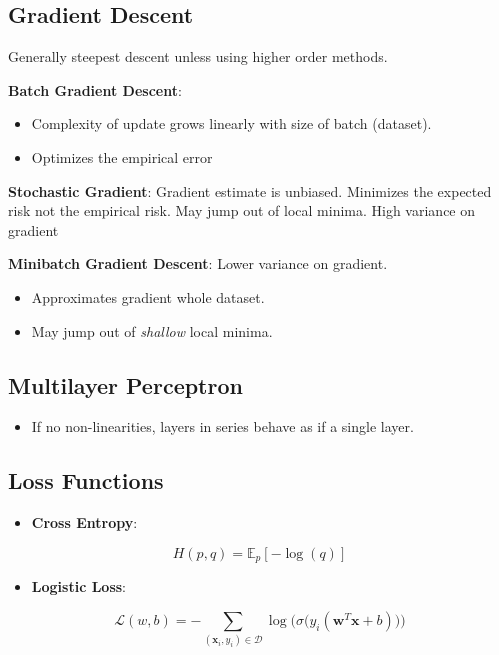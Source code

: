 \documentclass[10pt]{article}
\newcommand{\colortext}[2]{{\color{#1} #2}}
\newcommand{\red}[1]{\colortext{red}{#1}}
\newcommand{\blue}[1]{\colortext{blue}{#1}}
\begin{document}
\begin{multicols}{3}
  \subsection*{Gradient Descent}

  Generally \red{steepest descent} unless using higher order methods.

  \textbf{Batch Gradient Descent}:
  \begin{itemize}
    \item Complexity of update grows linearly with size of batch (dataset).
    \item Optimizes the \blue{empirical error}
  \end{itemize}

  \textbf{Stochastic Gradient}: Gradient estimate is unbiased. Minimizes the \red{expected risk} not the empirical risk.  May jump out of local minima. High variance on gradient

  \textbf{Minibatch Gradient Descent}: Lower variance on gradient.
  \begin{itemize}
    \item Approximates gradient whole dataset.
    \item May jump out of \textit{shallow} local minima.
  \end{itemize}

  \subsection*{Multilayer Perceptron}

  \begin{itemize}
    \item If no non-linearities, layers in series behave as if a single layer.
  \end{itemize}

  \subsection*{Loss Functions}

  \begin{itemize}
    \item \textbf{Cross Entropy}:
  \end{itemize}
  \vspace{-5pt}
  \[ H(p,q) = \mathbb{E}_{p}[-\log(q)] \]
  \begin{itemize}
    \item \textbf{Logistic Loss}:
  \end{itemize}
  \vspace{-5pt}
  \[ \mathcal{L}(w,b) = -\sum_{(\mathbf{x}_i,y_i)\in\mathcal{D}} \log\bigg( \sigma\Big(y_i(\mathbf{w}^T\mathbf{x}+b)\Big)\bigg) \]


\end{multicols}
\end{document}
